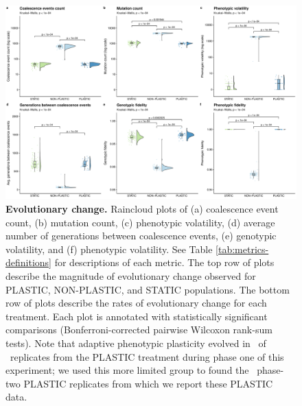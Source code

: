
\begin{figure}[h!]
    \centering
    \includegraphics[width=1\textwidth]{media/evolutionary-change-full-panel.pdf}
    \caption{\small
    \textbf{Evolutionary change.}
    Raincloud plots \citep{allen_raincloud_2019} of 
    (a) coalescence event count, 
    (b) mutation count, 
    (c) phenotypic volatility, 
    (d) average number of generations between coalescence events,
    (e) genotypic volatility,
    and (f) phenotypic volatility.
    See Table \ref{tab:metrics-definitions} for descriptions of each metric.
    The top row of plots describe the magnitude of evolutionary change observed for PLASTIC, NON-PLASTIC, and STATIC populations.
    The bottom row of plots describe the rates of evolutionary change for each treatment.
    Each plot is annotated with statistically significant comparisons (Bonferroni-corrected pairwise Wilcoxon rank-sum tests).
    Note that adaptive phenotypic plasticity evolved in \evolutionaryChangeRatePlasticReps\ of \evolutionaryChangeRateReplicates\ replicates from the PLASTIC treatment during phase one of this experiment; we used this more limited group to found the \evolutionaryChangeRatePlasticReps\ phase-two PLASTIC replicates from which we report these PLASTIC data.
    }
    \label{fig:evolutionary-dynamics}
\end{figure}